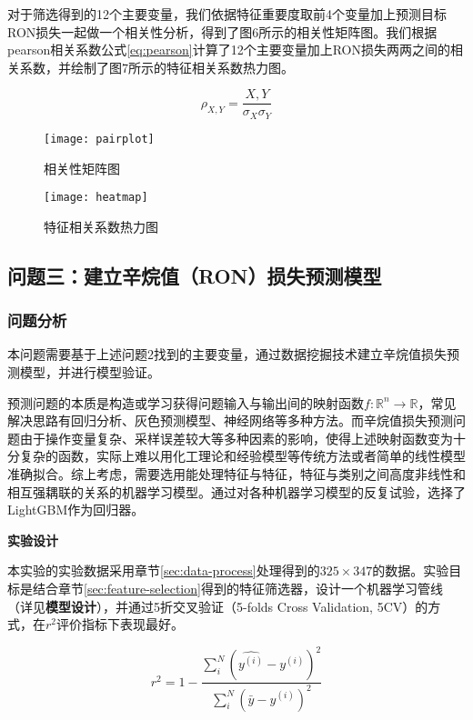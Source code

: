 \documentclass[bwprint]{gmcmthesis}
\begin{document}
对于筛选得到的12个主要变量，我们依据特征重要度取前4个变量加上预测目标RON损失一起做一个相关性分析，得到了图6所示的相关性矩阵图。我们根据pearson相关系数公式\eqref{eq:pearson}计算了12个主要变量加上RON损失两两之间的相关系数，并绘制了图7所示的特征相关系数热力图。

\begin{equation}\label{eq:pearson}
	\rho_{X,Y}=\frac{X,Y}{\sigma_X\sigma_Y}
\end{equation}


\begin{figure}[htb]
	\centering
	\texttt{[image: pairplot]}
	\caption{相关性矩阵图}
\end{figure}

\begin{figure}[htb]
	\centering
	\texttt{[image: heatmap]}
	\caption{特征相关系数热力图}
\end{figure}



\FloatBarrier
\subsection{问题三：建立辛烷值（RON）损失预测模型}\label{sec:modeling}

\FloatBarrier
\subsubsection{问题分析}

本问题需要基于上述问题2找到的主要变量，通过数据挖掘技术建立辛烷值损失预测模型，并进行模型验证。

预测问题的本质是构造或学习获得问题输入与输出间的映射函数$f: \mathbb{R}^n \rightarrow \mathbb{R}$，常见解决思路有回归分析、灰色预测模型、神经网络等多种方法。而辛烷值损失预测问题由于操作变量复杂、采样误差较大等多种因素的影响，使得上述映射函数变为十分复杂的函数，实际上难以用化工理论和经验模型等传统方法或者简单的线性模型准确拟合。综上考虑，需要选用能处理特征与特征，特征与类别之间高度非线性和相互强耦联的关系的机器学习模型。通过对各种机器学习模型的反复试验，选择了LightGBM作为回归器。

\textbf{实验设计}

本实验的实验数据采用章节\ref{sec:data-process}处理得到的$325 \times 347$的数据。实验目标是结合章节\ref{sec:feature-selection}得到的特征筛选器，设计一个机器学习管线（详见\textbf{模型设计}），并通过5折交叉验证（5-folds Cross Validation, 5CV）的方式，在$r^2$评价指标下表现最好。

\begin{equation}\label{eq:r2}
	r^2=1-\frac{\sum_i^N(\hat{y^{(i)}}-y^{(i)})^2}{\sum_i^N(\bar{y}-y^{(i)})^2}
\end{equation}
\end{document}

